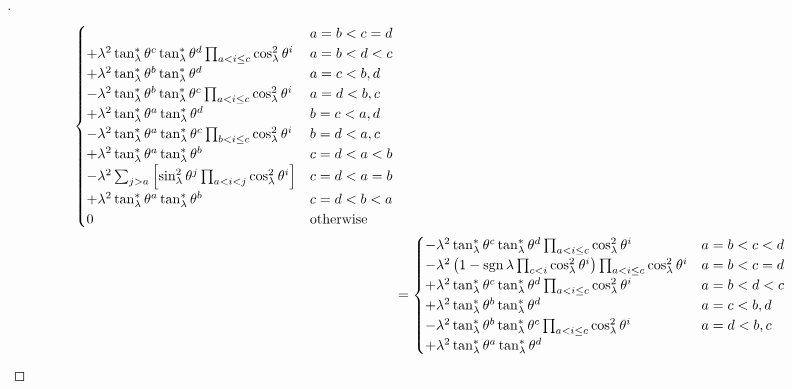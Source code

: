 \documentclass[../main.tex]{subfiles}
\begin{document}
\begin{proof}[]
\begin{align*}
\begin{cases}
&\text{\(a=b<c=d\)}\\
+\lambda^2\tan_\lambda^\ast\tensor{\theta}{^c}\tan_\lambda^\ast\tensor{\theta}{^d}\prod_{a<i\le c}\cos_\lambda^2\tensor{\theta}{^i}
&\text{\(a=b<d<c\)}\\
+\lambda^2\tan_\lambda^\ast\tensor{\theta}{^b}\tan_\lambda^\ast\tensor{\theta}{^d}
&\text{\(a=c<b,d\)}\\
-\lambda^2\tan_\lambda^\ast\tensor{\theta}{^b}\tan_\lambda^\ast\tensor{\theta}{^c}\prod_{a<i\le c}\cos_\lambda^2\tensor{\theta}{^i}
&\text{\(a=d<b,c\)}\\
+\lambda^2\tan_\lambda^\ast\tensor{\theta}{^a}\tan_\lambda^\ast\tensor{\theta}{^d}
&\text{\(b=c<a,d\)}\\
-\lambda^2\tan_\lambda^\ast\tensor{\theta}{^a}\tan_\lambda^\ast\tensor{\theta}{^c}\prod_{b<i\le c}\cos_\lambda^2\tensor{\theta}{^i}
&\text{\(b=d<a,c\)}\\
+\lambda^2\tan_\lambda^\ast\tensor{\theta}{^a}\tan_\lambda^\ast\tensor{\theta}{^b}
&\text{\(c=d<a<b\)}\\
-\lambda^2
\sum_{j>a}
\left[
\sin_\lambda^2\tensor{\theta}{^j}\prod_{a<i<j}\cos_\lambda^2\tensor{\theta}{^i}
\right]
&\text{\(c=d<a=b\)}\\
+\lambda^2\tan_\lambda^\ast\tensor{\theta}{^a}\tan_\lambda^\ast\tensor{\theta}{^b}
&\text{\(c=d<b<a\)}\\
0&\text{otherwise}\\
\end{cases}\\
&=\begin{cases}
-\lambda^2\tan_\lambda^\ast\tensor{\theta}{^c}\tan_\lambda^\ast\tensor{\theta}{^d}\prod_{a<i\le c}\cos_\lambda^2\tensor{\theta}{^i}
&\text{\(a=b<c<d\)}\\
-\lambda^2
\left(
1-\sign{\lambda}\prod_{c<i}\cos_\lambda^2\tensor{\theta}{^i}
\right)
\prod_{a<i\le c}\cos_\lambda^2\tensor{\theta}{^i}
&\text{\(a=b<c=d\)}\\
+\lambda^2\tan_\lambda^\ast\tensor{\theta}{^c}\tan_\lambda^\ast\tensor{\theta}{^d}\prod_{a<i\le c}\cos_\lambda^2\tensor{\theta}{^i}
&\text{\(a=b<d<c\)}\\
+\lambda^2\tan_\lambda^\ast\tensor{\theta}{^b}\tan_\lambda^\ast\tensor{\theta}{^d}
&\text{\(a=c<b,d\)}\\
-\lambda^2\tan_\lambda^\ast\tensor{\theta}{^b}\tan_\lambda^\ast\tensor{\theta}{^c}\prod_{a<i\le c}\cos_\lambda^2\tensor{\theta}{^i}
&\text{\(a=d<b,c\)}\\
+\lambda^2\tan_\lambda^\ast\tensor{\theta}{^a}\tan_\lambda^\ast\tensor{\theta}{^d}

\end{cases}
\end{align*}
\end{proof}
\end{document}
